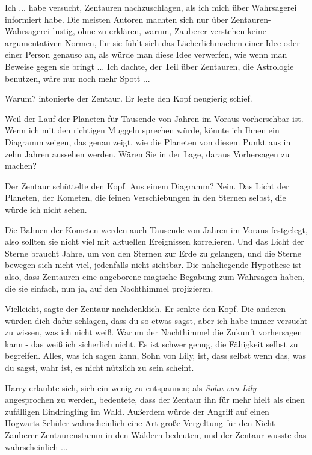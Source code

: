 \glqq{}Ich ... habe versucht, Zentauren nachzuschlagen, als ich mich über
Wahrsagerei informiert habe. Die meisten Autoren machten sich nur über
Zentauren-Wahrsagerei lustig, ohne zu erklären, warum, Zauberer verstehen keine
argumentativen Normen, für sie fühlt sich das Lächerlichmachen einer Idee oder
einer Person genauso an, als würde man diese Idee verwerfen, wie wenn man
Beweise gegen sie bringt ... Ich dachte, der Teil über Zentauren, die Astrologie
benutzen, wäre nur noch mehr Spott ...\grqq{}

\glqq{}Warum?\grqq{} intonierte der Zentaur. Er legte den Kopf neugierig schief.

\glqq{}Weil der Lauf der Planeten für Tausende von Jahren im Voraus vorhersehbar
ist. Wenn ich mit den richtigen Muggeln sprechen würde, könnte ich Ihnen ein
Diagramm zeigen, das genau zeigt, wie die Planeten von diesem Punkt aus in zehn
Jahren aussehen werden. Wären Sie in der Lage, daraus Vorhersagen zu machen?\grqq{}

Der Zentaur schüttelte den Kopf. \glqq{}Aus einem Diagramm? Nein. Das Licht der
Planeten, der Kometen, die feinen Verschiebungen in den Sternen selbst, die
würde ich nicht sehen.\grqq{}

\glqq{}Die Bahnen der Kometen werden auch Tausende von Jahren im Voraus
festgelegt, also sollten sie nicht viel mit aktuellen Ereignissen korrelieren.
Und das Licht der Sterne braucht Jahre, um von den Sternen zur Erde zu gelangen,
und die Sterne bewegen sich nicht viel, jedenfalls nicht sichtbar. Die
naheliegende Hypothese ist also, dass Zentauren eine angeborene magische
Begabung zum Wahrsagen haben, die sie einfach, nun ja, auf den Nachthimmel
projizieren.\grqq{}

\glqq{}Vielleicht\grqq{}, sagte der Zentaur nachdenklich. Er senkte den Kopf.
\glqq{}Die anderen würden dich dafür schlagen, dass du so etwas sagst, aber ich
habe immer versucht zu wissen, was ich nicht weiß. Warum der Nachthimmel die
Zukunft vorhersagen kann - das weiß ich sicherlich nicht. Es ist schwer genug,
die Fähigkeit selbst zu begreifen. Alles, was ich sagen kann, Sohn von Lily,
ist, dass selbst wenn das, was du sagst, wahr ist, es nicht nützlich zu sein
scheint.\grqq{}

Harry erlaubte sich, sich ein wenig zu entspannen; als\emph{ \glqq{}Sohn von
Lily\grqq{}} angesprochen zu werden, bedeutete, dass der Zentaur ihn für mehr
hielt als einen zufälligen Eindringling im Wald. Außerdem würde der Angriff auf
einen Hogwarts-Schüler wahrscheinlich eine Art große Vergeltung für den
Nicht-Zauberer-Zentaurenstamm in den Wäldern bedeuten, und der Zentaur wusste
das wahrscheinlich ...

